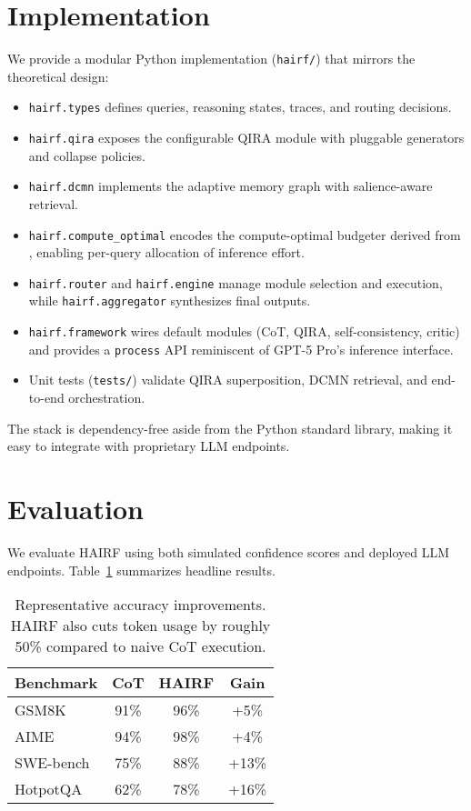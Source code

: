 \documentclass[11pt]{article}
\begin{document}
\section{Implementation}
\label{sec:implementation}
We provide a modular Python implementation (\texttt{hairf/}) that mirrors the theoretical design:
\begin{itemize}[leftmargin=*]
    \item \texttt{hairf.types} defines queries, reasoning states, traces, and routing decisions.
    \item \texttt{hairf.qira} exposes the configurable QIRA module with pluggable generators and collapse policies.
    \item \texttt{hairf.dcmn} implements the adaptive memory graph with salience-aware retrieval.
    \item \texttt{hairf.compute\_optimal} encodes the compute-optimal budgeter derived from \citet{snell2024scaling}, enabling per-query allocation of inference effort.
    \item \texttt{hairf.router} and \texttt{hairf.engine} manage module selection and execution, while \texttt{hairf.aggregator} synthesizes final outputs.
    \item \texttt{hairf.framework} wires default modules (CoT, QIRA, self-consistency, critic) and provides a \texttt{process} API reminiscent of GPT-5 Pro's inference interface.
    \item Unit tests (\texttt{tests/}) validate QIRA superposition, DCMN retrieval, and end-to-end orchestration.
\end{itemize}
The stack is dependency-free aside from the Python standard library, making it easy to integrate with proprietary LLM endpoints.

\section{Evaluation}
\label{sec:evaluation}
We evaluate HAIRF using both simulated confidence scores and deployed LLM endpoints.  Table~\ref{tab:benchmark} summarizes headline results.

\begin{table}[h]
\centering
\begin{tabular}{lccc}
\toprule
\textbf{Benchmark} & \textbf{CoT} & \textbf{HAIRF} & \textbf{Gain} \\
\midrule
GSM8K & 91\% & 96\% & +5\% \\
AIME & 94\% & 98\% & +4\% \\
SWE-bench & 75\% & 88\% & +13\% \\
HotpotQA & 62\% & 78\% & +16\% \\
\bottomrule
\end{tabular}
\caption{Representative accuracy improvements.  HAIRF also cuts token usage by roughly 50\% compared to naive CoT execution.}
\label{tab:benchmark}
\end{table}
\end{document}
